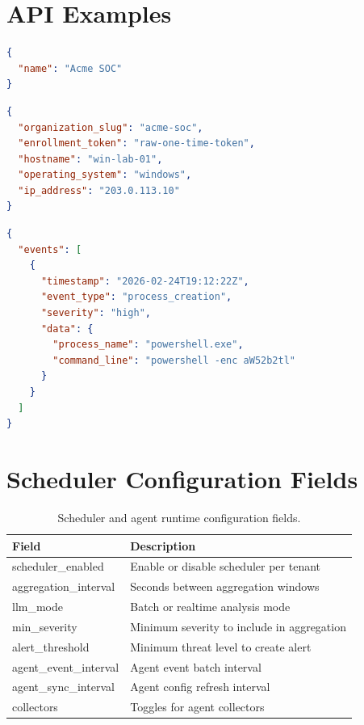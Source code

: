 \documentclass[conference]{IEEEtran}
\begin{document}
\FloatBarrier
\newpage

\appendix
\section{API Examples}
\begin{lstlisting}[language=json,caption={Organization creation request}]
{
  "name": "Acme SOC"
}
\end{lstlisting}

\begin{lstlisting}[language=json,caption={Enrollment request}]
{
  "organization_slug": "acme-soc",
  "enrollment_token": "raw-one-time-token",
  "hostname": "win-lab-01",
  "operating_system": "windows",
  "ip_address": "203.0.113.10"
}
\end{lstlisting}

\begin{lstlisting}[language=json,caption={Event batch example}]
{
  "events": [
    {
      "timestamp": "2026-02-24T19:12:22Z",
      "event_type": "process_creation",
      "severity": "high",
      "data": {
        "process_name": "powershell.exe",
        "command_line": "powershell -enc aW52b2tl"
      }
    }
  ]
}
\end{lstlisting}

\section{Scheduler Configuration Fields}
\begin{table}[!t]
\centering
\begin{tabular}{ll}
\toprule
\textbf{Field} & \textbf{Description} \\
\midrule
scheduler\_enabled & Enable or disable scheduler per tenant \\
aggregation\_interval & Seconds between aggregation windows \\
llm\_mode & Batch or realtime analysis mode \\
min\_severity & Minimum severity to include in aggregation \\
alert\_threshold & Minimum threat level to create alert \\
agent\_event\_interval & Agent event batch interval \\
agent\_sync\_interval & Agent config refresh interval \\
collectors & Toggles for agent collectors \\
\bottomrule
\end{tabular}
\caption{Scheduler and agent runtime configuration fields.}
\label{tab:scheduler-fields}
\end{table}
\end{document}
